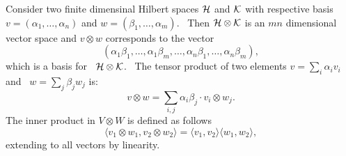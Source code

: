 \begin{definition} \label{def:tensor_prod_fin_hilb}
Consider two finite dimensinal Hilbert spaces $\mathcal{H}$ and $\mathcal{K}$ with respective basis $v=(\alpha_1, \ldots , \alpha_n)$ and $w=(\beta_1, \ldots , \alpha_m)$.  Then $\mathcal{H} \otimes \mathcal{K}$ is an $mn$ dimensional vector space and $v \otimes w$ corresponds to the vector
\[
(\alpha_1 \beta_1, \ldots, \alpha_1 \beta_m, \ldots, \alpha_n \beta_1, \ldots, \alpha_n \beta_m),
\]
which is a basis for  $\mathcal{H} \otimes \mathcal{K}$.  The tensor product of two elements $v = \sum_i \alpha_i v_i$ and  $w=\sum_j \beta_j  w_j$ is:
\begin{equation*}
 v \otimes w = \sum_{i,j} \alpha_i \beta_j \cdot v_i \otimes w_j.
\end{equation*}
 The inner product in $V \otimes W$ is defined as follows 
\begin{equation*}
  \langle v_1 \otimes w_1, v_2 \otimes w_2 \rangle = \langle v_1, v_2 \rangle \langle w_1, w_2 \rangle,
\end{equation*}
extending to all vectors by linearity.
\end{definition}

